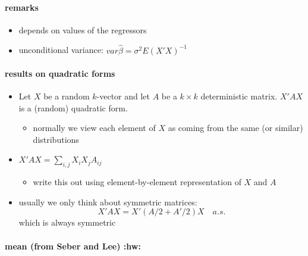 \paragraph{remarks}
\label{sec-3-1-2-2}

\begin{itemize}
\item depends on values of the regressors
\item unconditional variance: $var \hat \beta = \sigma^2 E
         (X'X)^{-1}$
\end{itemize}
\paragraph{results on quadratic forms}
\label{sec-3-1-3}

\begin{itemize}
\item Let $X$ be a random $k$-vector and let $A$ be a $k \times k$
        deterministic matrix.  $X'A X$ is a (random) quadratic form.
\begin{itemize}
\item normally we view each element of $X$ as coming from the same (or
          similar) distributions
\end{itemize}
\item $X'AX = \sum_{i,j} X_i X_j A_{ij}$
\begin{itemize}
\item write this out using element-by-element representation of $X$ and $A$
\end{itemize}
\item usually we only think about symmetric matrices:
        \[ X' A X = X'(A/2 + A'/2)X \quad a.s.\]
        which is always symmetric
\end{itemize}
\paragraph{mean (from Seber and Lee) \textbf{:hw:}}
\label{sec-3-1-3-1}

